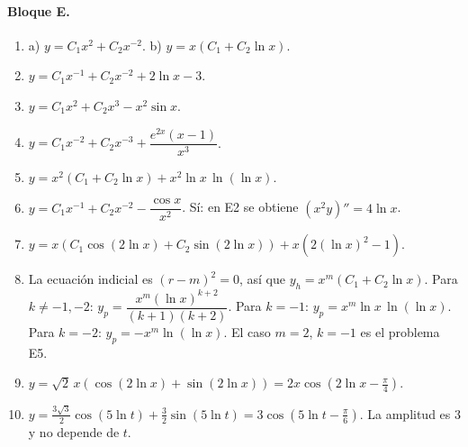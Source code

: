 {\paragraph{Bloque E.}
\begin{enumerate}[label=\textbf{E\arabic*.}, leftmargin=*]
    \item a) $y=C_1x^2+C_2x^{-2}$. \quad b) $y=x\left(C_1+C_2\ln x\right)$.
    \item $y=C_1x^{-1}+C_2x^{-2}+2\ln x-3$.
    \item $y=C_1x^2+C_2x^3-x^2\sin x$.
    \item $y=C_1x^{-2}+C_2x^{-3}+\dfrac{e^{2x}(x-1)}{x^3}$.
    \item $y=x^2\left(C_1+C_2\ln x\right)+x^2\ln x\,\ln(\ln x)$.
    \item $y=C_1x^{-1}+C_2x^{-2}-\dfrac{\cos x}{x^2}$. S\'i: en E2 se obtiene $\left(x^2y\right)''=4\ln x$.
    \item $y=x\left(C_1\cos(2\ln x)+C_2\sin(2\ln x)\right)+x\left(2(\ln x)^2-1\right)$.
    \item La ecuaci\'on indicial es $(r-m)^2=0$, as\'i que $y_h=x^m\left(C_1+C_2\ln x\right)$. Para $k\neq-1,-2$: $y_p=\dfrac{x^m(\ln x)^{k+2}}{(k+1)(k+2)}$. Para $k=-1$: $y_p=x^m\ln x\,\ln(\ln x)$. Para $k=-2$: $y_p=-x^m\ln(\ln x)$. El caso $m=2$, $k=-1$ es el problema E5.
    \item $y=\sqrt2\,x\left(\cos(2\ln x)+\sin(2\ln x)\right)=2x\cos\left(2\ln x-\frac\pi4\right)$.
    \item $y=\frac{3\sqrt3}{2}\cos(5\ln t)+\frac32\sin(5\ln t)=3\cos\left(5\ln t-\frac\pi6\right)$. La amplitud es $3$ y no depende de $t$.
\end{enumerate}

}
